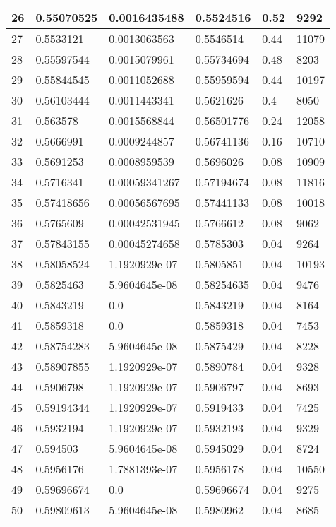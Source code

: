 \begin{longtable}{|l|l|l|l|l|l|}
26 & 0.55070525 & 0.0016435488 & 0.5524516 & 0.52 & 9292 \\ \hline 
27 & 0.5533121 & 0.0013063563 & 0.5546514 & 0.44 & 11079 \\ \hline 
28 & 0.55597544 & 0.0015079961 & 0.55734694 & 0.48 & 8203 \\ \hline 
29 & 0.55844545 & 0.0011052688 & 0.55959594 & 0.44 & 10197 \\ \hline 
30 & 0.56103444 & 0.0011443341 & 0.5621626 & 0.4 & 8050 \\ \hline 
31 & 0.563578 & 0.0015568844 & 0.56501776 & 0.24 & 12058 \\ \hline 
32 & 0.5666991 & 0.0009244857 & 0.56741136 & 0.16 & 10710 \\ \hline 
33 & 0.5691253 & 0.0008959539 & 0.5696026 & 0.08 & 10909 \\ \hline 
34 & 0.5716341 & 0.00059341267 & 0.57194674 & 0.08 & 11816 \\ \hline 
35 & 0.57418656 & 0.00056567695 & 0.57441133 & 0.08 & 10018 \\ \hline 
36 & 0.5765609 & 0.00042531945 & 0.5766612 & 0.08 & 9062 \\ \hline 
37 & 0.57843155 & 0.00045274658 & 0.5785303 & 0.04 & 9264 \\ \hline 
38 & 0.58058524 & 1.1920929e-07 & 0.5805851 & 0.04 & 10193 \\ \hline 
39 & 0.5825463 & 5.9604645e-08 & 0.58254635 & 0.04 & 9476 \\ \hline 
40 & 0.5843219 & 0.0 & 0.5843219 & 0.04 & 8164 \\ \hline 
41 & 0.5859318 & 0.0 & 0.5859318 & 0.04 & 7453 \\ \hline 
42 & 0.58754283 & 5.9604645e-08 & 0.5875429 & 0.04 & 8228 \\ \hline 
43 & 0.58907855 & 1.1920929e-07 & 0.5890784 & 0.04 & 9328 \\ \hline 
44 & 0.5906798 & 1.1920929e-07 & 0.5906797 & 0.04 & 8693 \\ \hline 
45 & 0.59194344 & 1.1920929e-07 & 0.5919433 & 0.04 & 7425 \\ \hline 
46 & 0.5932194 & 1.1920929e-07 & 0.5932193 & 0.04 & 9329 \\ \hline 
47 & 0.594503 & 5.9604645e-08 & 0.5945029 & 0.04 & 8724 \\ \hline 
48 & 0.5956176 & 1.7881393e-07 & 0.5956178 & 0.04 & 10550 \\ \hline 
49 & 0.59696674 & 0.0 & 0.59696674 & 0.04 & 9275 \\ \hline 
50 & 0.59809613 & 5.9604645e-08 & 0.5980962 & 0.04 & 8685 \\ \hline 

\end{longtable}
